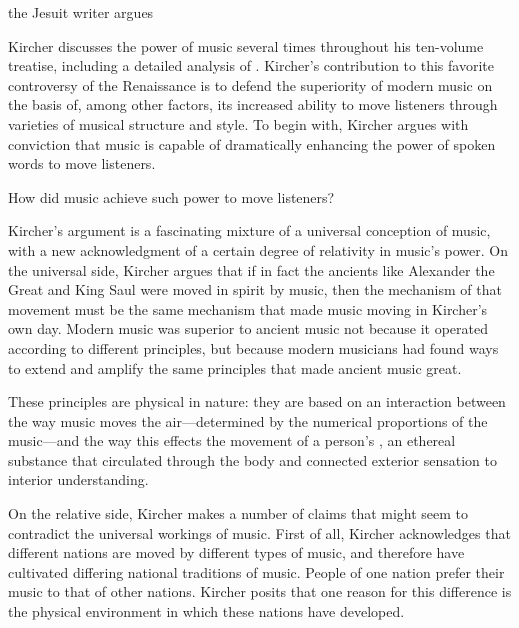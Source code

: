 the Jesuit writer argues

Kircher discusses the power of music several times throughout his ten-volume treatise, including a detailed analysis of .%
  \Autocite[bk.~VII, Erothema VI, 549]{Kircher:Musurgia}
Kircher's contribution to this favorite controversy of the Renaissance is to defend the superiority of modern music on the basis of, among other factors, its increased ability to move listeners through varieties of musical structure and style.
To begin with, Kircher argues with conviction that music is capable of dramatically enhancing the power of spoken words to move listeners.

How did music achieve such power to move listeners?


Kircher's argument is a fascinating mixture of a universal conception of music, with a new acknowledgment of a certain degree of relativity in music's power.
On the universal side, Kircher argues that if in fact the ancients like Alexander the Great and King Saul were moved in spirit by music, then the mechanism of that movement must be the same mechanism that made music moving in Kircher's own day.
Modern music was superior to ancient music not because it operated according to different principles, but because modern musicians had found ways to extend and amplify the same principles that made ancient music great.

These principles are physical in nature: they are based on an interaction between the way music moves the air---determined by the numerical proportions of the music---and the way this effects the movement of a person's , an ethereal substance that circulated through the body and connected exterior sensation to interior understanding. %

On the relative side, Kircher makes a number of claims that might seem to contradict the universal workings of music.
First of all, Kircher acknowledges that different nations are moved by different types of music, and therefore have cultivated differing national traditions of music.
People of one nation prefer their music to that of other nations.
Kircher posits that one reason for this difference is the physical environment in which these nations have developed. %

